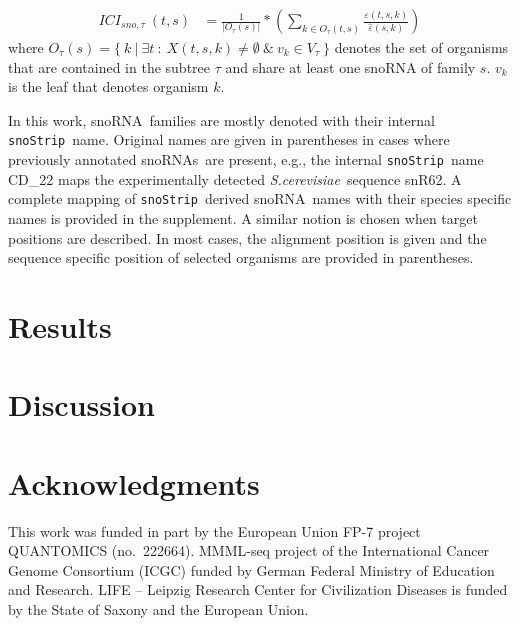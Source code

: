 \documentclass[preprint,3p,times,twocolumn]{elsarticle}
\newcommand{\snos}{snoRNAs}
\newcommand{\sno}{snoRNA}
\newcommand{\snostrip}{\texttt{snoStrip}}
\newcommand{\sce}{\emph{S.cerevisiae}}
\begin{document}
\begin{equation}
  \begin{split}
    ICI_{sno,\tau}\:(t,s) & = \frac{1}{|O_\tau(s)|} * \left( \sum_{k\in O_\tau(t,s)} \frac{\varepsilon(t,s,k)}{\hat\varepsilon(s,k)} \right)
  \end{split}
\end{equation}
where $O_\tau(s) = \{\  k\  |\  \exists t\  :\  X(t,s,k) \ne \emptyset\ \&\ 
v_k \in V_\tau\ \}$ denotes the set of organisms that are contained in the
subtree $\tau$ and share at least one snoRNA of family $s$. $v_k$ is the leaf
that denotes organism $k$.

\vspace{5mm}
\par
In this work, \sno\ families are mostly denoted with their 
internal \snostrip\ name. Original names are given in parentheses in cases where previously annotated \snos\
are present, e.g., the internal \snostrip\ name
CD\_22 maps the experimentally detected \sce\ sequence snR62. A
complete mapping of \snostrip\ derived \sno\ names with their
species specific names is provided in the supplement. 
A similar notion is chosen when target positions are described. In most
cases, the alignment position is given and the sequence specific
position of selected organisms are provided in parentheses. 


\section{Results}


\section{Discussion}



\section*{Acknowledgments}

This work was funded in part by the European Union FP-7 project QUANTOMICS
(no.\ 222664). MMML-seq project of the International Cancer Genome 
Consortium (ICGC) funded by German Federal Ministry of Education and Research. 
LIFE -- Leipzig Research Center for Civilization Diseases 
is funded by the State of Saxony and the European Union.
\end{document}
